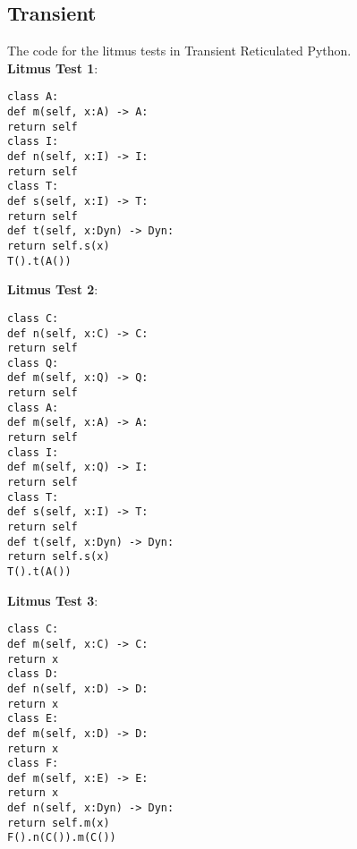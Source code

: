 \documentclass[]{article}
\begin{document}
\subsection*{Transient}

The code for the litmus tests in Transient Reticulated Python. \\

\noindent\textbf{Litmus Test 1}:
\begin{verbatim}
class A:
def m(self, x:A) -> A:
return self
class I:
def n(self, x:I) -> I:
return self
class T:
def s(self, x:I) -> T:
return self
def t(self, x:Dyn) -> Dyn:
return self.s(x)
T().t(A())
\end{verbatim}

\noindent
\textbf{Litmus Test 2}:
\begin{verbatim}
class C:
def n(self, x:C) -> C:
return self
class Q:
def m(self, x:Q) -> Q:
return self     
class A:
def m(self, x:A) -> A:
return self
class I:
def m(self, x:Q) -> I:
return self
class T:
def s(self, x:I) -> T:
return self
def t(self, x:Dyn) -> Dyn:
return self.s(x)
T().t(A())
\end{verbatim}

\noindent\textbf{Litmus Test 3}:
\begin{verbatim}
class C:
def m(self, x:C) -> C:
return x
class D:
def n(self, x:D) -> D:
return x
class E:
def m(self, x:D) -> D:
return x
class F:
def m(self, x:E) -> E:
return x   
def n(self, x:Dyn) -> Dyn:
return self.m(x)
F().n(C()).m(C())
\end{verbatim}
\end{document}
